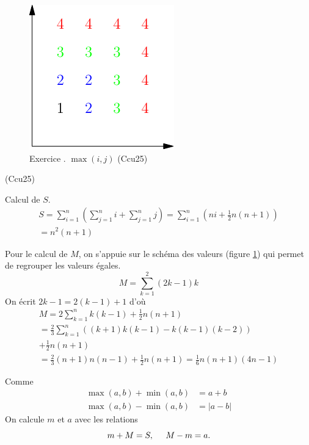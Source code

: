 \begin{figure}
 \centering
 \includegraphics{./Ccu25_1.pdf}
 \caption{Exercice \theenumi. \; $\max(i,j)$ \tiny{ (Ccu25)}}
 \label{fig:Ccu25_1}
\end{figure}

\begin{tiny}(Ccu25)\end{tiny} Calcul de $S$.
\begin{multline*}
 S = \sum_{i=1}^n \left( \sum_{j=1}^n i + \sum_{j=1}^n j\right) 
 = \sum_{i=1}^n \left( n i + \frac{1}{2}n(n+1)\right) \\
 = n^2(n+1)
\end{multline*}

Pour le calcul de $M$, on s'appuie sur le schéma des valeurs (figure \ref{fig:Ccu25_1}) qui permet de regrouper les valeurs égales.
\begin{displaymath}
 M =
 \sum_{k=1}^2(2k-1)k
\end{displaymath}
On écrit $2k-1=2(k-1)+1$ d'où
\begin{multline*}
 M = 
2\sum_{k=1}^{n}k(k-1) +\frac{1}{2}n(n+1) \\
= \frac{2}{3}\sum_{k=1}^n\left( (k+1)k(k-1) - k(k-1)(k-2)\right) \\
+ \frac{1}{2}n(n+1)\\
= \frac{2}{3}(n+1)n(n-1) + \frac{1}{2}n(n+1)
= \frac{1}{6}n(n+1)(4n-1)
\end{multline*}

Comme
\begin{align*}
 \max(a,b) + \min(a,b) &= a+b\\
 \max(a,b) - \min(a,b) &= |a-b|
\end{align*}
On calcule $m$ et $a$ avec les relations
\begin{displaymath}
 m + M = S,\hspace{0.5cm} M - m = a.
\end{displaymath}

